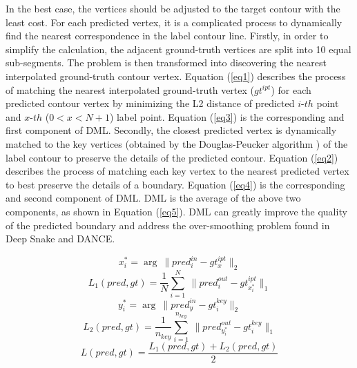 \documentclass[10pt,twocolumn,letterpaper]{article}
\begin{document}
In the best case, the vertices should be adjusted to the target contour with the least cost. For each predicted vertex, it is a complicated process to dynamically find the nearest correspondence in the label contour line. Firstly, in order to simplify the calculation, the adjacent ground-truth vertices are split into 10 equal sub-segments. The problem is then transformed into discovering the nearest interpolated ground-truth contour vertex. Equation (\ref{eq1}) describes the process of matching the nearest interpolated ground-truth vertex ($gt^{ipt}$) for each predicted contour vertex by minimizing the L2 distance of predicted $i$-$th$ point and $x$-$th$ ($0<x<N+1$) label point. Equation (\ref{eq3}) is the corresponding and first component of DML. Secondly, the closest predicted vertex is dynamically matched to the key vertices (obtained by the Douglas-Peucker algorithm \cite{douglas}) of the label contour to preserve the details of the predicted contour. Equation (\ref{eq2}) describes the process of matching each key vertex to the nearest predicted vertex to best preserve the details of a boundary. Equation (\ref{eq4}) is the corresponding and second component of DML. DML is the average of the above two components, as shown in Equation (\ref{eq5}). DML can greatly improve the quality of the predicted boundary and address the over-smoothing problem found in Deep Snake and DANCE.\vspace{-2mm}
\begin{small}
\begin{equation}
x_{i}^{*}=\mathop{\arg\min_{x}}\ \|pred_{i}^{in} - gt_{x}^{ipt}\|_{2} \label{eq1}
\end{equation}\vspace{-3mm}
\begin{equation}
L_{1}(pred,gt)=\frac{1}{N} \sum_{i=1}^{N}\ \|pred^{out}_{i} - gt^{ipt}_{x_{i}^{*}}\|_{1} \label{eq3}
\end{equation}\vspace{-1mm}
\begin{equation}
y_{i}^{*}=\mathop{\arg\min_{y}}\ \|pred_{y}^{in} - gt_{i}^{key}\|_{2} \label{eq2}
\end{equation}\vspace{-3mm}
\begin{equation}
L_{2}(pred,gt)=\frac{1}{n_{key}} \sum_{i=1}^{n_{key}}\ \|pred^{out}_{y_{i}^{*}} - gt^{key}_{i}\|_{1} \label{eq4}
\end{equation}
\begin{equation}
L(pred,gt)=\frac{L_{1}(pred,gt) + L_{2}(pred,gt)}{2} \label{eq5}
\end{equation}
\end{small}\vspace{-3mm}
\end{document}
